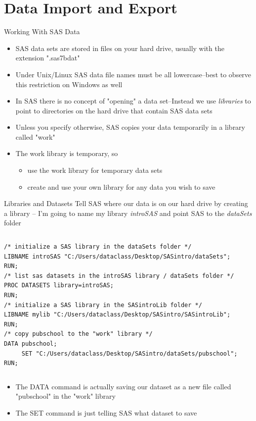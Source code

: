 \documentclass[table,smaller]{beamer}
\begin{document}
\section{Data Import and Export}
\label{sec-2}

\begin{frame}[label=sec-2-1]{Working With SAS Data}
\begin{itemize}
\item SAS data sets are stored in files on your hard drive, usually with the extension ".sas7bdat"
\item Under Unix/Linux SAS data file names must be all lowercase--best to observe this restriction on Windows as well
\item In SAS there is no concept of "opening" a data set--Instead we use \emph{libraries} to point to directories on the hard drive that contain SAS data sets
\item Unless you specify otherwise, SAS copies your data temporarily in a library called "work"
\item The work library is temporary, so
\begin{itemize}
\item use the work library for temporary data sets
\item create and use your own library for any data you wish to save
\end{itemize}
\end{itemize}
\end{frame}
\begin{frame}[fragile,label=sec-2-2]{Libraries and Datasets}
 Tell SAS where our data is on our hard drive by creating a library -- I'm going to name my library \emph{introSAS} and point SAS to the \emph{dataSets} folder

\vspace{-.75em} \begin{columns}  \begin{block}{}
\begin{verbatim}
/* initialize a SAS library in the dataSets folder */
LIBNAME introSAS "C:/Users/dataclass/Desktop/SASintro/dataSets";
RUN;
/* list sas datasets in the introSAS library / dataSets folder */
PROC DATASETS library=introSAS;
RUN;
/* initialize a SAS library in the SASintroLib folder */
LIBNAME mylib "C:/Users/dataclass/Desktop/SASintro/SASintroLib";
RUN;
/* copy pubschool to the "work" library */
DATA pubschool;
     SET "C:/Users/dataclass/Desktop/SASintro/dataSets/pubschool";
RUN;
\end{verbatim}
\end{block} \end{columns} \vspace{.25em}

\begin{itemize}
\item The DATA command is actually saving our dataset as a new  file called "pubschool" in the "work" library
\item The SET command is just telling SAS what dataset to save
\end{itemize}
\end{frame}
\end{document}
